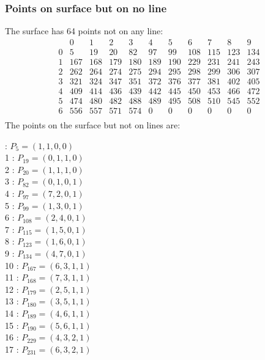 \documentclass{article}
\begin{document}
{\subsubsection*{Points on surface but on no line}
The surface has 64 points not on any line:\\
$$
\begin{array}{r|*{10}{r}}
 & 0 & 1 & 2 & 3 & 4 & 5 & 6 & 7 & 8 & 9\\
\hline
0 & 5 & 19 & 20 & 82 & 97 & 99 & 108 & 115 & 123 & 134\\
1 & 167 & 168 & 179 & 180 & 189 & 190 & 229 & 231 & 241 & 243\\
2 & 262 & 264 & 274 & 275 & 294 & 295 & 298 & 299 & 306 & 307\\
3 & 321 & 324 & 347 & 351 & 372 & 376 & 377 & 381 & 402 & 405\\
4 & 409 & 414 & 436 & 439 & 442 & 445 & 450 & 453 & 466 & 472\\
5 & 474 & 480 & 482 & 488 & 489 & 495 & 508 & 510 & 545 & 552\\
6 & 556 & 557 & 571 & 574 & 0 & 0 & 0 & 0 & 0 & 0\\
\end{array}
$$
The points on the surface but not on lines are:\\
\begin{multicols}{2}
 : $P_{5}=( 1, 1, 0, 0 )$\\
1 : $P_{19}=( 0, 1, 1, 0 )$\\
2 : $P_{20}=( 1, 1, 1, 0 )$\\
3 : $P_{82}=( 0, 1, 0, 1 )$\\
4 : $P_{97}=( 7, 2, 0, 1 )$\\
5 : $P_{99}=( 1, 3, 0, 1 )$\\
6 : $P_{108}=( 2, 4, 0, 1 )$\\
7 : $P_{115}=( 1, 5, 0, 1 )$\\
8 : $P_{123}=( 1, 6, 0, 1 )$\\
9 : $P_{134}=( 4, 7, 0, 1 )$\\
10 : $P_{167}=( 6, 3, 1, 1 )$\\
11 : $P_{168}=( 7, 3, 1, 1 )$\\
12 : $P_{179}=( 2, 5, 1, 1 )$\\
13 : $P_{180}=( 3, 5, 1, 1 )$\\
14 : $P_{189}=( 4, 6, 1, 1 )$\\
15 : $P_{190}=( 5, 6, 1, 1 )$\\
16 : $P_{229}=( 4, 3, 2, 1 )$\\
17 : $P_{231}=( 6, 3, 2, 1 )$\\

\end{multicols}}
\end{document}
